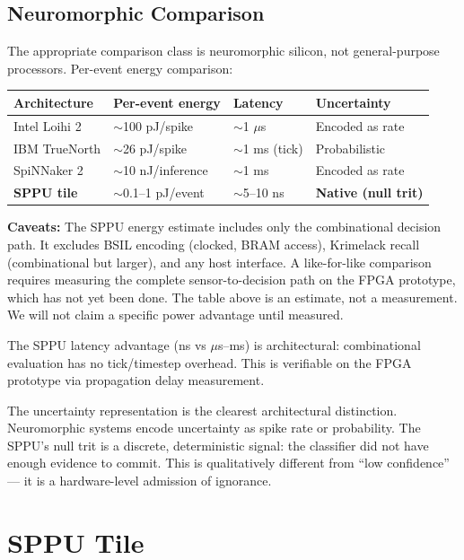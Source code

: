 \documentclass[11pt, a4paper]{article}
\begin{document}
\subsection{Neuromorphic Comparison}

The appropriate comparison class is neuromorphic silicon, not
general-purpose processors. Per-event energy comparison:

\begin{center}
\begin{tabular}{@{}llll@{}}
\toprule
\textbf{Architecture} & \textbf{Per-event energy} & \textbf{Latency} & \textbf{Uncertainty} \\
\midrule
Intel Loihi 2 & $\sim$100 pJ/spike & $\sim$1 $\mu$s & Encoded as rate \\
IBM TrueNorth & $\sim$26 pJ/spike & $\sim$1 ms (tick) & Probabilistic \\
SpiNNaker 2 & $\sim$10 nJ/inference & $\sim$1 ms & Encoded as rate \\
\textbf{SPPU tile} & $\sim$0.1--1 pJ/event & $\sim$5--10 ns & \textbf{Native (null trit)} \\
\bottomrule
\end{tabular}
\end{center}

\textbf{Caveats:} The SPPU energy estimate includes only the
combinational decision path. It excludes BSIL encoding (clocked,
BRAM access), Krimelack recall (combinational but larger), and
any host interface. A like-for-like comparison requires measuring
the complete sensor-to-decision path on the FPGA prototype, which
has not yet been done. The table above is an estimate, not a
measurement. We will not claim a specific power advantage until
measured.

The SPPU latency advantage (ns vs $\mu$s--ms) is architectural:
combinational evaluation has no tick/timestep overhead. This is
verifiable on the FPGA prototype via propagation delay measurement.

The uncertainty representation is the clearest architectural
distinction. Neuromorphic systems encode uncertainty as spike rate
or probability. The SPPU's null trit is a discrete, deterministic
signal: the classifier did not have enough evidence to commit.
This is qualitatively different from ``low confidence'' --- it is
a hardware-level admission of ignorance.

\section{SPPU Tile}
\end{document}
